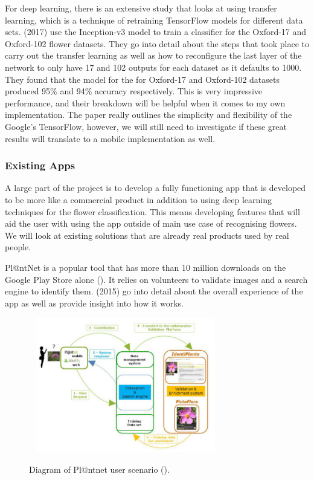 \documentclass{article}
\begin{document}
\par

For deep learning, there is an extensive study that looks at using transfer learning, which is a technique of retraining
TensorFlow models for different data sets. \citeauthor{Xia2017} (2017) use the Inception-v3 model to train a classifier for 
the Oxford-17 and Oxford-102 flower datasets. They go into detail about the steps that took place to carry out the 
transfer learning as well as how to reconfigure the last layer of the network to only have 17 and 102 outputs for each 
dataset as it defaults to 1000. They found that the model for the for Oxford-17 and Oxford-102 datasets 
produced 95\% and 94\% accuracy respectively. This is very impressive performance, and their breakdown will be helpful 
when it comes to my own implementation. The paper really outlines the simplicity and flexibility of the Google's 
TensorFlow, however, we will still need to investigate if these great results will translate to a mobile implementation 
as well.

\subsubsection{Existing Apps}

A large part of the project is to develop a fully functioning app that is developed to be more like a commercial product
in addition to using deep learning techniques for the flower classification. This means developing features that will 
aid the user with using the app outside of main use case of recognising flowers. We will look at existing solutions that
are already real products used by real people.

\par

Pl@ntNet is a popular tool that has more than 10 million downloads on the Google Play Store alone (\cite{googleplay}). 
It relies on volunteers to validate images and a search engine to identify them. \citeauthor{joly:hal-01182775} (2015) 
go into detail about the overall experience of the app as well as provide insight into how it works.

\begin{figure}[h]\
    \centering
    \includegraphics[width=0.7\textwidth]{plantnet.png}
    \caption{Diagram of Pl@ntnet user scenario (\cite{joly:hal-01182775}).}
\end{figure}
\end{document}
